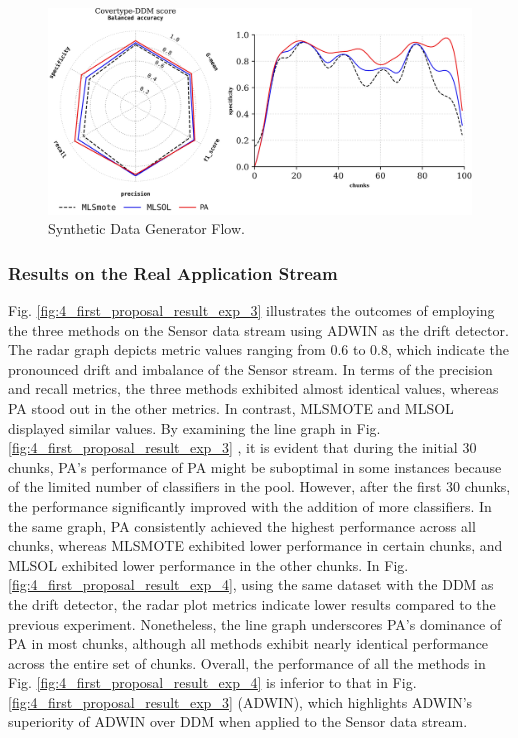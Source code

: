 \begin{figure}[!ht]
	\centering
	\includegraphics[width=1\linewidth]{4_Taxonomy/figures/exp_2.png}
	\caption{Synthetic Data Generator Flow.}
	\label{fig:4_first_proposal_result_exp_2}
\end{figure}

\subsubsection{Results on the Real Application Stream}
Fig. \ref{fig:4_first_proposal_result_exp_3} illustrates the outcomes of employing the three methods on the Sensor data stream using ADWIN as the drift detector. The radar graph depicts metric values ranging from 0.6 to 0.8, which indicate the pronounced drift and imbalance of the Sensor stream. In terms of the precision and recall metrics, the three methods exhibited almost identical values, whereas PA stood out in the other metrics. In contrast, MLSMOTE and MLSOL displayed similar values. By examining the line graph in Fig. \ref{fig:4_first_proposal_result_exp_3}
, it is evident that during the initial 30 chunks, PA's performance of PA might be suboptimal in some instances because of the limited number of classifiers in the pool. However, after the first 30 chunks, the performance significantly improved with the addition of more classifiers. In the same graph, PA consistently achieved the highest performance across all chunks, whereas MLSMOTE exhibited lower performance in certain chunks, and MLSOL exhibited lower performance in the other chunks. In Fig. \ref{fig:4_first_proposal_result_exp_4}, using the same dataset with the DDM as the drift detector, the radar plot metrics indicate lower results compared to the previous experiment. Nonetheless, the line graph underscores PA's dominance of PA in most chunks, although all methods exhibit nearly identical performance across the entire set of chunks. Overall, the performance of all the methods in Fig. \ref{fig:4_first_proposal_result_exp_4} is inferior to that in Fig. \ref{fig:4_first_proposal_result_exp_3} (ADWIN), which highlights ADWIN's superiority of ADWIN over DDM when applied to the Sensor data stream. 


